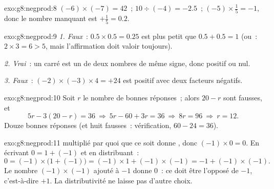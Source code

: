 \begin{solution}{exo:g8:negprod:8}
$(-6) \times (-7) = 42$~; \quad
$10 \div (-4) = -2.5$~; \quad
$(-5) \times \frac15 = -1$, donc le nombre manquant est
$+\frac15 = 0.2$.
\end{solution}

\begin{solution}{exo:g8:negprod:9}
\emph{1. Faux}~: $0.5 \times 0.5 = 0.25$ est plus petit que
$0.5 + 0.5 = 1$ (ou~: $2 \times 3 = 6 > 5$, mais l'affirmation doit
valoir toujours).

\emph{2. Vrai}~: un carré est un  de deux nombres de même
signe, donc positif ou nul.

\emph{3. Faux}~: $(-2) \times (-3) \times 4 = +24$ est positif avec
deux facteurs négatifs.
\end{solution}

\begin{solution}{exo:g8:negprod:10}
Soit $r$ le nombre de bonnes réponses~; alors $20 - r$ sont fausses,
et
\[
5r - 3(20 - r) = 36
\ \Longrightarrow\
5r - 60 + 3r = 36
\ \Longrightarrow\
8r = 96
\ \Longrightarrow\
r = 12 .
\]
Douze bonnes réponses (et huit fausses~: vérification,
$60 - 24 = 36$).
\end{solution}

\begin{solution}{exo:g8:negprod:11}
 multiplié par quoi que ce soit donne , donc
$(-1) \times 0 = 0$. En écrivant $0 = 1 + (-1)$ et en distribuant~:
\[
0 = (-1) \times \bigl(1 + (-1)\bigr)
= (-1) \times 1 + (-1) \times (-1)
= -1 + (-1) \times (-1).
\]
Le nombre $(-1) \times (-1)$ ajouté à $-1$ donne $0$~: ce doit être
l'opposé de $-1$, c'est-à-dire $+1$. La distributivité ne laisse pas
d'autre choix.
\end{solution}

